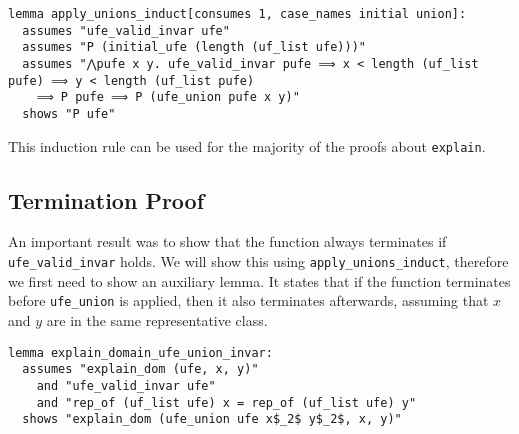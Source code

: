 \begin{lstlisting}
lemma apply_unions_induct[consumes 1, case_names initial union]:
  assumes "ufe_valid_invar ufe"
  assumes "P (initial_ufe (length (uf_list ufe)))"
  assumes "⋀pufe x y. ufe_valid_invar pufe ⟹ x < length (uf_list pufe) ⟹ y < length (uf_list pufe)
    ⟹ P pufe ⟹ P (ufe_union pufe x y)"
  shows "P ufe"
\end{lstlisting}

This induction rule can be used for the majority of the proofs about \lstinline|explain|.

\subsection{Termination Proof}
\label{subsection:termination}

An important result was to show that the function always terminates if \lstinline{ufe_valid_invar} holds. We will show this using \lstinline|apply_unions_induct|, therefore we first need to show an auxiliary lemma. It states that if the function terminates before \lstinline{ufe_union} is applied, then it also terminates afterwards, assuming that $x$ and $y$ are in the same representative class.

\begin{lstlisting}
lemma explain_domain_ufe_union_invar:
  assumes "explain_dom (ufe, x, y)"
    and "ufe_valid_invar ufe"
    and "rep_of (uf_list ufe) x = rep_of (uf_list ufe) y"
  shows "explain_dom (ufe_union ufe x$_2$ y$_2$, x, y)"
\end{lstlisting}

